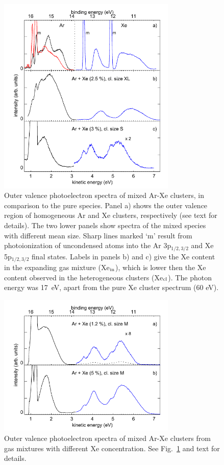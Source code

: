 \begin{figure}[ht]
 \centering
 \includegraphics[width=8.5cm]{pics/figure_oval_1.pdf}
 \caption{
Outer valence photoelectron spectra of mixed Ar-Xe clusters, in comparison to the pure species. 
Panel a) shows the outer valence region of homogeneous Ar and Xe clusters, respectively (see text for details). 
The two lower panels show spectra of the mixed species with different mean size. 
Sharp lines marked `m' result from photoionization of uncondensed atoms into the Ar 3p$_{1/2,3/2}$ and Xe 5p$_{1/2,3/2}$ final states. 
Labels in panels b) and c) give the Xe content in the expanding gas mixture (Xe$_{\rm in}$), which is lower then the Xe content observed in the heterogeneous clusters (Xe$_{\rm cl}$). 
The photon energy was 17~eV, apart from the pure Xe cluster spectrum (60 eV).
}
 \label{figure:oval1}
\end{figure}


\begin{figure}[ht]
 \centering
 \includegraphics[width=8.5cm]{pics/figure_oval_2.pdf}
 \caption{
Outer valence photoelectron spectra of mixed Ar-Xe clusters from gas mixtures with different Xe concentration. 
See Fig.\ \ref{figure:oval1} and text for details.
}
 \label{figure:oval2}
\end{figure}

